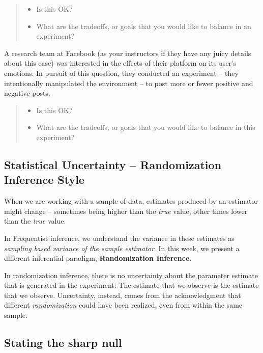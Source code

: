 \documentclass[
]{article}
\providecommand{\tightlist}{%
  \setlength{\itemsep}{0pt}\setlength{\parskip}{0pt}}
\begin{document}
\begin{quote}
\begin{itemize}
\tightlist
\item
  Is this OK?
\item
  What are the tradeoffs, or goals that you would like to balance in an experiment?
\end{itemize}
\end{quote}

A research team at Facebook (as your instructors if they have any juicy details about this case) was interested in the effects of their platform on its user's emotions. In pursuit of this question, they conducted an experiment -- they intentionally manipulated the environment -- to post more or fewer positive and negative posts.

\begin{quote}
\begin{itemize}
\tightlist
\item
  Is this OK?
\item
  What are the tradeoffs, or goals that you would like to balance in this experiment?
\end{itemize}
\end{quote}

\hypertarget{statistical-uncertainty-randomization-inference-style}{%
\subsection{Statistical Uncertainty -- Randomization Inference Style}\label{statistical-uncertainty-randomization-inference-style}}

When we are working with a sample of data, estimates produced by an estimator might change -- sometimes being higher than the \emph{true} value, other times lower than the \emph{true} value.

In Frequentist inference, we understand the variance in these estimates as \emph{sampling based variance of the sample estimator}. In this week, we present a different inferential paradigm, \textbf{Randomization Inference}.

In randomization inference, there is no uncertainty about the parameter estimate that is generated in the experiment: The estimate that we observe is the estimate that we observe. Uncertainty, instead, comes from the acknowledgment that different \emph{randomization} could have been realized, even from within the same sample.

\hypertarget{stating-the-sharp-null}{%
\subsection{Stating the sharp null}\label{stating-the-sharp-null}}
\end{document}
